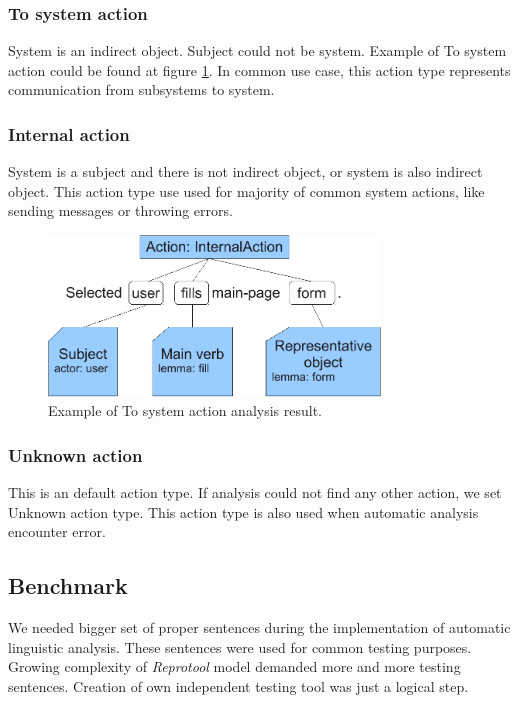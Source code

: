 \subsubsection{To system action}
System is an indirect object. Subject could not be system. Example of To system action could be found at figure \ref{fig:ToSystemActionExample}. In common use case, this action type represents communication from subsystems to system.

\subsubsection{Internal action}
System is a subject and there is not indirect object, or system is also indirect object. This action type use used for majority of common system actions, like sending messages or throwing errors.

\begin{figure}[ht]
  \centering
  \includegraphics[width=250pt]{images/ToSystemActionExample}
  \caption{Example of To system action analysis result.}
  \label{fig:ToSystemActionExample}
\end{figure}

\subsubsection{Unknown action}
This is an default action type. If analysis could not find any other action, we set Unknown action type. This action type is also used when automatic analysis encounter error. 

\subsection{Benchmark}
\label{sec:benchmark}

We needed bigger set of proper sentences during the implementation of automatic linguistic analysis. These sentences were used for common testing purposes. Growing complexity of \emph{Reprotool} model demanded more and more testing sentences. Creation of own independent testing tool was just a logical step.

